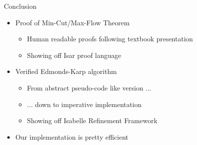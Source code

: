 \documentclass[fleqn]{beamer}
\begin{document}
\begin{frame}{Conclusion}
  \begin{itemize}
   \item Proof of Min-Cut/Max-Flow Theorem
    \begin{itemize}
     \item Human readable proofs following textbook presentation
     \item Showing off Isar proof language
    \end{itemize}
   \item Verified Edmonds-Karp algorithm
    \begin{itemize}
     \item From abstract pseudo-code like version ...
     \item ... down to imperative implementation
     \item Showing off Isabelle Refinement Framework
    \end{itemize}
   \item Our implementation is pretty efficient
    
  \end{itemize}
  \vfill
  
    
    
\end{frame}
\end{document}
